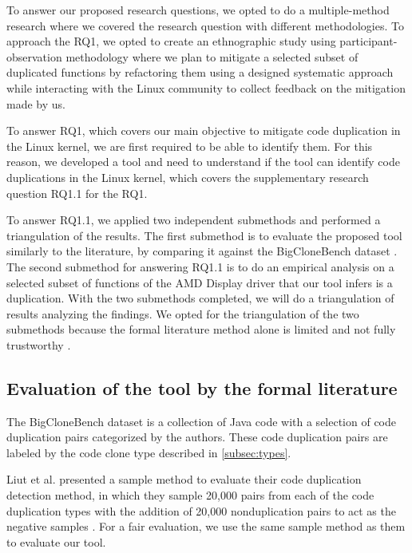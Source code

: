 \en

To answer our proposed research questions, we opted to do a multiple-method research 
where we covered the research question with different methodologies. To approach the RQ1, 
we opted to create an ethnographic study using participant-observation methodology where 
we plan to mitigate a selected subset of duplicated functions by refactoring them using 
a designed systematic approach while interacting with the Linux community to collect 
feedback on the mitigation made by us.


To answer RQ1, which covers our main objective to mitigate code duplication in the Linux 
kernel, we are first required to be able to identify them. For this reason, we developed 
a tool and need to understand if the tool can identify code duplications in the Linux kernel, 
which covers the supplementary research question RQ1.1 for the RQ1.

To answer RQ1.1, we applied two independent submethods and performed a triangulation of 
the results. The first submethod is to evaluate the proposed tool similarly to the literature, 
by comparing it against the BigCloneBench dataset \citep{bigclonebench}. The second submethod
for answering RQ1.1 is to do an empirical analysis on a selected subset of functions of the 
AMD Display driver that our tool infers is a duplication. With the two submethods completed, 
we will do a triangulation of results analyzing the findings. We opted for the triangulation 
of the two submethods because the formal literature method alone is limited and not fully 
trustworthy \citep{bigfail, litreview}.

\subsection{Evaluation of the tool by the formal literature}

The BigCloneBench dataset \citep{bigclonebench} is a collection of Java code with a selection of
code duplication pairs categorized by the authors. These code duplication pairs are labeled by 
the code clone type described in \ref{subsec:types}.

Liut et al. presented a sample method to evaluate their code duplication detection method, 
in which they sample 20,000 pairs from each of the code duplication types with the addition 
of 20,000 nonduplication pairs to act as the negative samples \citep{tailor}. 
For a fair evaluation, we use the same sample method as them to evaluate our tool.

